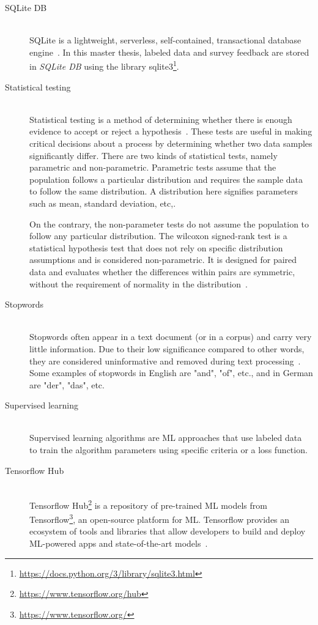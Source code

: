 \begin{description}
			
	
				\item[SQLite DB] \hfill \\ SQLite is a lightweight,  serverless, self-contained, transactional database engine~\cite{bhosale2015sqlite}. In this master thesis, labeled data and survey feedback are stored in \emph{SQLite DB} using the library sqlite3\footnote{\url{https://docs.python.org/3/library/sqlite3.html}}.
				
		\item[Statistical testing] \hfill \\ Statistical testing is a method of determining whether there is enough evidence
	to accept or reject a hypothesis~\cite{kaur2015comparative}. These tests are useful in
	making critical decisions about a process by determining whether two data samples significantly
	differ. There are two kinds of statistical tests, namely parametric
	and non-parametric. Parametric tests assume that the population follows a particular distribution and requires the sample data to follow the same distribution. A distribution
	here signifies parameters such as mean, standard deviation, etc,.
	
	On the contrary, the non-parameter tests do not assume the population to follow
	any particular distribution. The wilcoxon signed-rank test is a statistical hypothesis test that does not rely on specific distribution assumptions and is considered non-parametric. It is designed for paired data and evaluates whether the differences within pairs are symmetric, without the requirement of normality in the distribution~\cite{oyeka2012modified}.
	
		 \item[Stopwords] \hfill \\ Stopwords often appear in a text document (or in a corpus) and carry very little information. Due to their low significance compared to other words, they are considered uninformative and removed during text processing~\cite{sarica2021stopwords}. Some examples of stopwords in English are "and", "of", etc., and in German are "der", "das", etc.
		 
		 
		 	\item[Supervised learning] \hfill \\ Supervised learning algorithms are \ac{ML} approaches that use labeled data~\cite{9155761} to train the algorithm parameters using specific criteria or a loss function.
	
					 \item[Tensorflow Hub] \hfill \\ Tensorflow Hub\footnote{\url{https://www.tensorflow.org/hub}} is a repository of pre-trained \ac{ML} models from Tensorflow\footnote{\url{https://www.tensorflow.org/}}, an open-source platform for \ac{ML}. Tensorflow provides an ecosystem of tools and libraries that allow developers to build and deploy \ac{ML}-powered apps and state-of-the-art models~\cite{tensorflow_developers_2022_6574269}.
				

\end{description}
